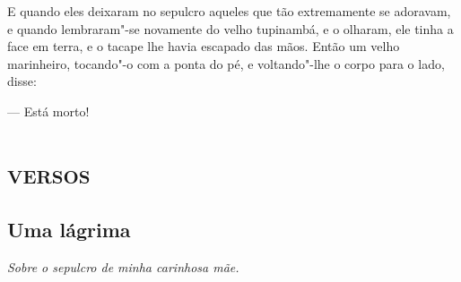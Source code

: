 E quando eles deixaram no sepulcro aqueles que tão extremamente se
adoravam, e quando lembraram"-se novamente do velho tupinambá, e o
olharam, ele tinha a face em terra, e o tacape lhe havia escapado das
mãos. Então um velho marinheiro, tocando"-o com a ponta do pé, e
voltando"-lhe o corpo para o lado, disse:

--- Está morto!

\part{\textsc{versos}}

\chapter{Uma lágrima}

\hfill{}\emph{Sobre o sepulcro de minha carinhosa mãe.}

\medskip


